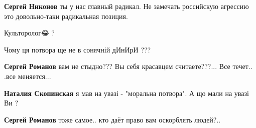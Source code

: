 \begin{itemize}
\begin{itemize}
 
\textbf{Сергей Никонов} ты у нас главный радикал. Не замечать российскую агрессию это довольно-таки радикальная позиция.

\end{itemize}

 
Культоролог😂🤣?

 
Чому ця потвора ще не в сонячній дИнИрИ ???

\begin{itemize}
 
\textbf{Сергей Романов} вам не стыдно??? Вы себя красавцем считаете???... Все течет.. .все меняется...

 
\textbf{Наталия Скопинская} я мав на увазі - "моральна потвора". А що мали на увазі Ви ?

 
\textbf{Сергей Романов} тоже самое.. кто даёт право вам оскорблять людей?..

 

\end{itemize}
\end{itemize}
